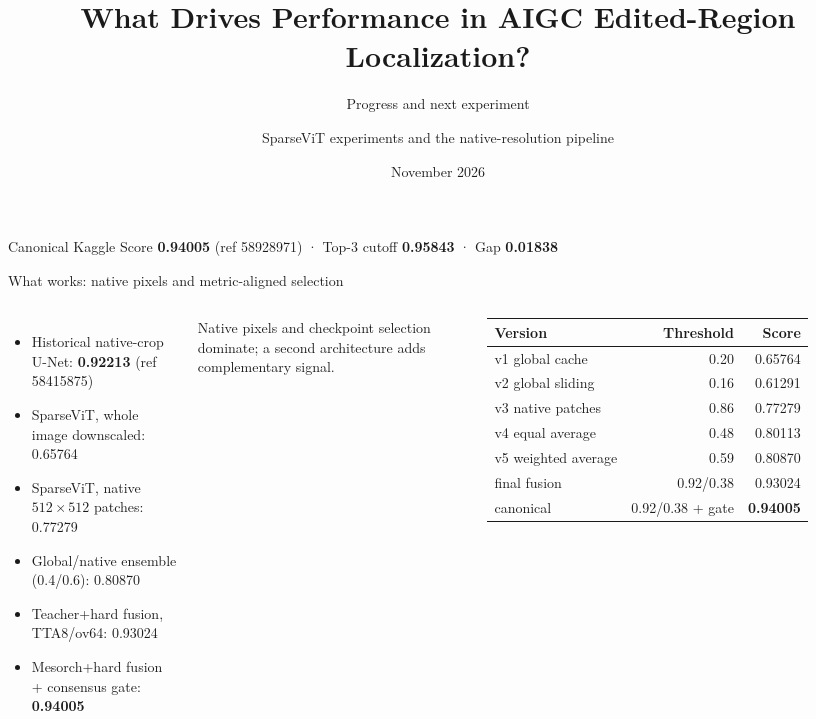 \documentclass[10pt]{beamer}
\title{What Drives Performance in AIGC Edited-Region Localization?}
\subtitle{Progress and next experiment}
\author{SparseViT experiments and the native-resolution pipeline}
\date{November 2026}
\begin{document}
\begin{frame}
\titlepage
\begin{center}
\small
Canonical Kaggle Score \textbf{0.94005} (ref 58928971) \quad · \quad
Top-3 cutoff \textbf{0.95843} \quad · \quad Gap \textbf{0.01838}
\end{center}
\end{frame}

\begin{frame}{What works: native pixels and metric-aligned selection}
\begin{columns}[T]
\small
\begin{itemize}
\item Historical native-crop U-Net: \textbf{0.92213} (ref 58415875)
\item SparseViT, whole image downscaled: 0.65764
\item SparseViT, native $512\times512$ patches: 0.77279
\item Global/native ensemble (0.4/0.6): 0.80870
\item Teacher+hard fusion, TTA8/ov64: 0.93024
\item Mesorch+hard fusion + consensus gate: \textbf{0.94005}
\end{itemize}
\vspace{.2cm}
Native pixels and checkpoint selection dominate; a second architecture adds complementary signal.
\footnotesize
\begin{tabular}{lrr}
\toprule Version & Threshold & Score \\
\midrule
v1 global cache & 0.20 & 0.65764 \\
v2 global sliding & 0.16 & 0.61291 \\
v3 native patches & 0.86 & 0.77279 \\
v4 equal average & 0.48 & 0.80113 \\
v5 weighted average & 0.59 & 0.80870 \\
final fusion & 0.92/0.38 & 0.93024 \\
canonical & 0.92/0.38 + gate & \textbf{0.94005} \\
\bottomrule
\end{tabular}
\end{columns}
\end{frame}
\end{document}
